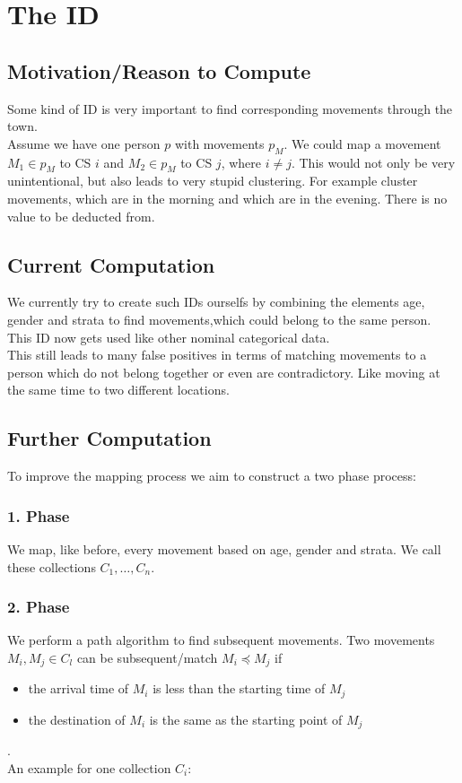 \documentclass{article}
\begin{document}
\section{The ID}\label{ID}
	\subsection{Motivation/Reason to Compute}
	Some kind of ID is very important to find corresponding movements through the town. \\
	Assume we have one person $p$ with movements $p_M$. We could map a movement $M_1 \in p_M$ to CS $i$ and $M_2 \in p_M$ to CS $j$, where $i\neq j$. This would not only be very unintentional, but also leads to very stupid clustering. For example cluster movements, which are in the morning and which are in the evening. There is no value to be deducted from. 
	\subsection{Current Computation}
	We currently try to create such IDs ourselfs by combining the elements age, gender and strata to find movements,which could belong to the same person. This ID now gets used like other nominal categorical data.\\
	This still leads to many false positives in terms of matching movements to a person which do not belong together or even are contradictory. Like moving at the same time to two different locations. 
	\subsection{Further Computation}
	To improve the mapping process we aim to construct a two phase process:
	\subsubsection{1. Phase}
	We map, like before, every movement based on age, gender and strata. We call these collections $C_1, \dots, C_n$. 
	\subsubsection{2. Phase}
	We perform a path algorithm to find subsequent movements. Two movements $M_i, M_j \in C_l$ can be subsequent/match $M_i \preceq M_j$ if 
	\begin{itemize}
		\item the arrival time of $M_i$ is less than the starting time of $M_j$
		\item the destination of $M_i$ is the same as the starting point of $M_j$
	\end{itemize}.\\
	An example for one collection $C_i$:\\
	
\end{document}
